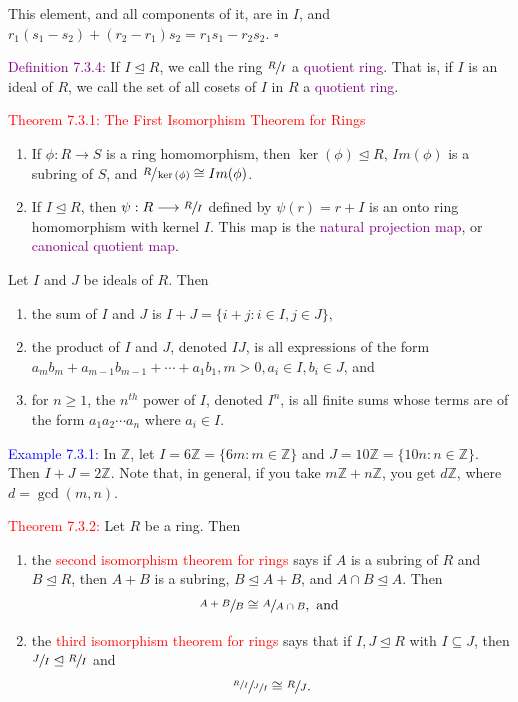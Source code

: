 \documentclass{article}
\begin{document}
This element, and all components of it, are in $I$, and $r_1(s_1-s_2)+(r_2-r_1)s_2=r_1s_1-r_2s_2$. $\square$

\textcolor{purple}{Definition 7.3.4:} If $I \trianglelefteq R$, we call the ring $\sfrac{R}{I}$ a \textcolor{purple}{quotient ring}. That 
is, if $I$ is an ideal of $R$, we call the set of all cosets of $I$ in $R$ a \textcolor{purple}{quotient ring}.

\textcolor{red}{Theorem 7.3.1: The First Isomorphism Theorem for Rings}\\
\begin{enumerate}
    \item If $\phi:R \longrightarrow S$ is a ring homomorphism, then $\ker{(\phi)} \trianglelefteq R$, $Im(\phi)$ is a subring of $S$, and 
    $\sfrac{R}{\ker{(\phi)}} \cong Im(\phi)$.
    \item If $I \trianglelefteq R$, then $\psi:R \longrightarrow \sfrac{R}{I}$ defined by $\psi(r)=r+I$ is an onto ring homomorphism with 
    kernel $I$. This map is the \textcolor{purple}{natural projection map}, or \textcolor{purple}{canonical quotient map}.
\end{enumerate}

Let $I$ and $J$ be ideals of $R$. Then
\begin{enumerate}
    \item the sum of $I$ and $J$ is $I+J = \{i+j: i \in I, j \in J\}$,
    \item the product of $I$ and $J$, denoted $IJ$, is all expressions of the form $a_mb_m + a_{m-1}b_{m-1} + \cdots + a_1b_1, m>0, a_i \in I, b_i \in J$, 
    and 
    \item for $n \geq 1$, the $n^{th}$ power of $I$, denoted $I^n$, is all finite sums whose terms are of the form $a_1a_2 \cdots a_n$ 
    where $a_i \in I$.
\end{enumerate}

\textcolor{blue}{Example 7.3.1:} In $\mathbb{Z}$, let $I = 6\mathbb{Z} = \{6m: m \in \mathbb{Z}\}$ and $J = 10\mathbb{Z} = \{10n: n \in \mathbb{Z}\}$. 
Then $I+J=2\mathbb{Z}$. Note that, in general, if you take $m\mathbb{Z} + n\mathbb{Z}$, you get $d\mathbb{Z}$, where $d=\gcd{(m,n)}$. 

\textcolor{red}{Theorem 7.3.2:} Let $R$ be a ring. Then 
\begin{enumerate}
    \item the \textcolor{red}{second isomorphism theorem for rings} says if $A$ is a subring of $R$ and $B \trianglelefteq R$, then $A+B$ 
    is a subring, $B \trianglelefteq A+B$, and $A \cap B \trianglelefteq A$. Then
    \[
        \sfrac{A+B}{B} \cong \sfrac{A}{A \cap B}, \text{ and }
    \]
    \item the \textcolor{red}{third isomorphism theorem for rings} says that if $I,J \trianglelefteq R$ with $I \subseteq J$, then 
    $\sfrac{J}{I} \trianglelefteq \sfrac{R}{I}$ and 
    \[
        \sfrac{\sfrac{R}{I}}{\sfrac{J}{I}} \cong \sfrac{R}{J}.
    \]
\end{enumerate}
\end{document}
